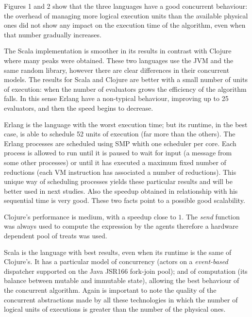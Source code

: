 Figures 1 and 2 show that the three languages have a good concurrent behaviour: the overhead of managing more logical execution units than the available physical ones did not show any impact on the execution time of the algorithm, even when that number gradually increases.

%
%    

The Scala implementation is smoother in its results in contrast with
Clojure where many peaks were obtained.
These two languages use the JVM and the same random library, however there are clear differences in their concurrent models. The results for Scala and Clojure are better with a small number of units of execution: when the number of evaluators grows the efficiency of the algorithm falls. In this sense Erlang have a non-typical behaviour, improving up to 25 evaluators, and then the speed begins to decrease.

Erlang is the language with the worst execution time; but its runtime, in the best case, is able to schedule 52 units of execution (far more than the others). The Erlang processes are scheduled using SMP whith one scheduler per core. Each process is allowed to run until it is paused to wait for input (a message from some other processes) or until it has executed a maximum fixed number of reductions (each VM instruction has associated a number of reductions). This unique way of scheduling processes yields these particular results and will be better used in next studies. Also the speedup obtained in relationship with his sequential time is very good. These two facts point to a possible good scalability.

Clojure's performance is medium, with a speedup close to $1$. The {\em send} function was always used to compute the expression by the agents therefore a hardware dependent pool of treats was used.

Scala is the language with best results, even when its runtime is the same of Clojure's. It has a particular model of concurrency (actors on a {\em event-based} dispatcher supported on the Java JSR166 fork-join pool); and of computation (its balance between mutable and immutable state), allowing the best behaviour of the concurrent algorithm. Again is important to note the quality of the concurrent abstractions made by all these technologies in which the number of logical units of executions is greater than the number of the physical ones.

